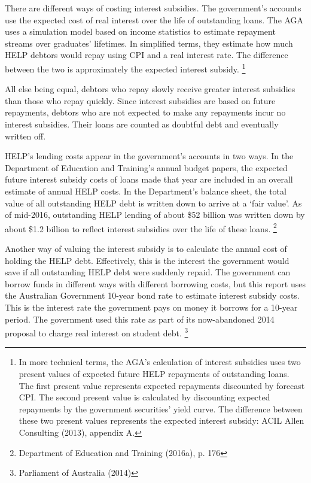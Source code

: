 \documentclass[embargoed]{grattan}
\begin{document}
There are different ways of costing interest subsidies.
The government's accounts use the expected cost of real interest over the life of outstanding loans.
The \gls{AGA} uses a simulation model based on income statistics to estimate repayment streams over graduates' lifetimes.
In simplified terms, they estimate how much HELP debtors would repay using \gls{CPI} and a real interest rate.
The difference between the two is approximately the expected interest subsidy.%
\footnote{In more technical terms, the \gls{AGA}'s calculation of interest subsidies uses two present values of expected future HELP repayments of outstanding loans.
The first present value represents expected repayments discounted by forecast \gls{CPI}.
The second present value is calculated by discounting expected repayments by the government securities' yield curve.
The difference between these two present values represents the expected interest subsidy: ACIL Allen Consulting (2013), appendix A.}

All else being equal, debtors who repay slowly receive greater interest subsidies than those who repay quickly.
Since interest subsidies are based on future repayments, debtors who are not expected to make any repayments incur no interest subsidies.
Their loans are counted as doubtful debt and eventually written off.

HELP's lending costs appear in the government's accounts in two ways.
In the Department of Education and Training's annual budget papers, the expected future interest subsidy costs of loans made that year are included in an overall estimate of annual HELP costs.
In the Department's balance sheet, the total value of all outstanding HELP debt is written down to arrive at a `fair value'.
As of mid-2016, outstanding HELP lending of about \$52 billion was written down by about \$1.2 billion to reflect interest subsidies over the life of these loans.%
\footnote{Department of Education and Training (2016a), p. 176}

Another way of valuing the interest subsidy is to calculate the annual cost of holding the HELP debt.
Effectively, this is the interest the government would save if all outstanding HELP debt were suddenly repaid.
The government can borrow funds in different ways with different borrowing costs, but this report uses the Australian Government 10-year bond rate to estimate interest subsidy costs.
This is the interest rate the government pays on money it borrows for a 10-year period.
The government used this rate as part of its now-abandoned 2014 proposal to charge real interest on student debt.%
\footnote{Parliament of Australia (2014)}
\end{document}
